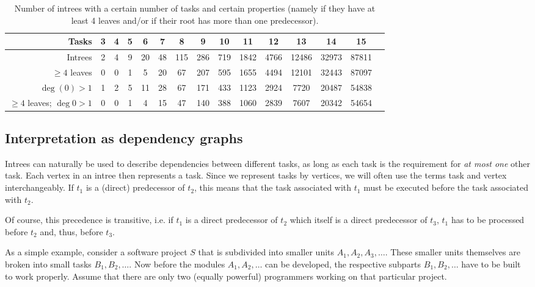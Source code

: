 \begin{table}[th]
  \centering
  \begin{tabular}[ht]{r|cccccccccccccc}
    Tasks & 3 & 4 & 5 & 6 & 7 & 8 & 9 & 10 & 11 & 12 & 13 & 14 & 15 \\
    \hline
    Intrees & 2 & 4 & 9 & 20 & 48 & 115 & 286 & 719 & 1842 & 4766 & 12486 & 32973 & 87811 \\
    $\geq 4$ leaves & 0& 0& 1& 5& 20& 67& 207& 595& 1655& 4494& 12101& 32443& 87097 \\
    $\deg (0) > 1$ & 1 & 2 & 5 & 11 & 28 & 67 & 171 & 433 & 1123 & 2924 & 7720 & 20487 & 54838 \\
    $\geq 4$ leaves; $\deg{0} > 1$ & 0 & 0 & 1 & 4 & 15 & 47 & 140 & 388 & 1060 & 2839 & 7607 & 20342 & 54654 \\
  \end{tabular}
  \caption{Number of intrees with a certain number of tasks and certain properties (namely if they have at least 4 leaves and/or if their root has more than one predecessor).}
  \label{tab:number-of-intrees-summary}
\end{table}

\subsection{Interpretation as dependency graphs}
\label{sec:intrees-interpreted-as-dependency-graphs}

Intrees can naturally be used to describe dependencies between different tasks, as long as each task is the requirement for \emph{at most one} other task. Each vertex in an intree then represents a task. Since we represent tasks by vertices, we will often use the terms task and vertex interchangeably. If $t_1$ is a (direct) predecessor of $t_2$, this means that the task associated with $t_1$ must be executed before the task associated with $t_2$. 

Of course, this precedence is transitive, i.e. if $t_1$ is a direct predecessor of $t_2$ which itself is a direct predecessor of $t_3$, $t_1$ has to be processed before $t_2$ and, thus, before $t_3$.

As a simple example, consider a software project $S$ that is subdivided into smaller units $A_1,A_2,A_3,\dots$. These smaller units themselves are broken into small tasks $B_1,B_2,\dots$. Now before the modules $A_1,A_2,\dots$ can be developed, the respective subparts $B_1,B_2,\dots$ have to be built to work properly. Assume that there are only two (equally powerful) programmers working on that particular project. 


